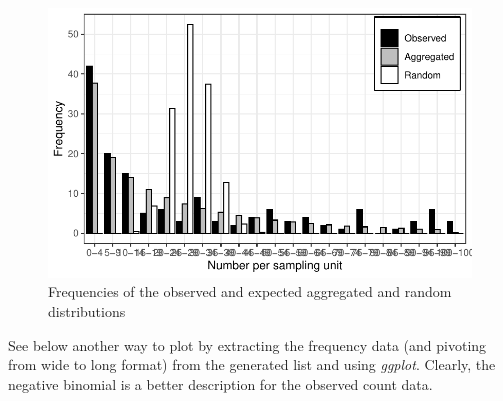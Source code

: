 \documentclass[
  letterpaper,
  DIV=11,
  numbers=noendperiod]{scrreprt}
\newenvironment{Shaded}{\begin{snugshade}}{\end{snugshade}}
\newcommand{\AttributeTok}[1]{\textcolor[rgb]{0.40,0.45,0.13}{#1}}
\newcommand{\DecValTok}[1]{\textcolor[rgb]{0.68,0.00,0.00}{#1}}
\newcommand{\FunctionTok}[1]{\textcolor[rgb]{0.28,0.35,0.67}{#1}}
\newcommand{\NormalTok}[1]{\textcolor[rgb]{0.00,0.23,0.31}{#1}}
\newcommand{\OtherTok}[1]{\textcolor[rgb]{0.00,0.23,0.31}{#1}}
\newcommand{\SpecialCharTok}[1]{\textcolor[rgb]{0.37,0.37,0.37}{#1}}
\newcommand{\StringTok}[1]{\textcolor[rgb]{0.13,0.47,0.30}{#1}}
\begin{document}
\begin{figure}[H]

{\centering \includegraphics{spatial-tests_files/figure-pdf/fig-freq-1.pdf}

}

\caption{\label{fig-freq}Frequencies of the observed and expected
aggregated and random distributions}

\end{figure}

See below another way to plot by extracting the frequency data (and
pivoting from wide to long format) from the generated list and using
\emph{ggplot}. Clearly, the negative binomial is a better description
for the observed count data.

\begin{Shaded}
\end{Shaded}
\end{document}
